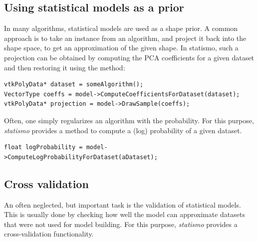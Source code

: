 \documentclass{InsightArticle}
\newcommand{\statismo}{\emph{statismo}\xspace}
\begin{document}
\subsection{Using statistical models as  a prior}
In many algorithms, statistical models are used as a shape prior. 
A common approach is to take an instance from an algorithm, and project it back into the 
shape space, to get an approximation of the given shape. In statismo, such a projection can be
obtained by computing the PCA coefficients for a given dataset and then restoring it using the 
 method:
\begin{verbatim}
vtkPolyData* dataset = someAlgorithm();
VectorType coeffs = model->ComputeCoefficientsForDataset(dataset);
vtkPolyData* projection = model->DrawSample(coeffs);
\end{verbatim}
Often, one simply regularizes an algorithm with the probability. For this purpose, \statismo 
provides a method to compute a (log) probability of a given dataset. 
\begin{verbatim}
float logProbability = model->ComputeLogProbabilityForDataset(aDataset);
\end{verbatim}

\subsection{Cross validation}
An often neglected, but important task is the validation of statistical models. This is usually done by 
checking how well the model can approximate datasets that were not used for model building. 
For this purpose, \statismo provides a cross-validation functionality.
\end{document}
